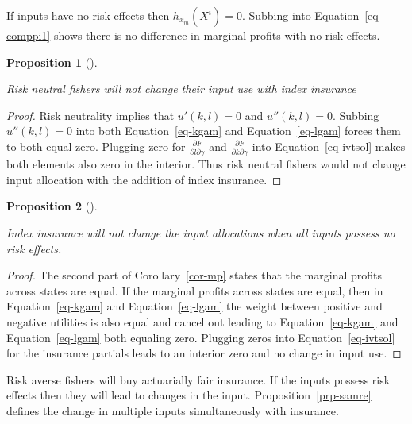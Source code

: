 \documentclass[
  letterpaper,
  DIV=11,
  numbers=noendperiod]{scrartcl}
\theoremstyle{plain}
\newtheorem{proposition}{Proposition}[section]
\theoremstyle{plain}
\theoremstyle{remark}
\begin{document}
If inputs have no risk effects then \(h_{x_m}(X^i)=0\). Subbing into
Equation~\ref{eq-comppi1} shows there is no difference in marginal
profits with no risk effects.

\begin{proposition}[]\protect\hypertarget{prp-rn}{}\label{prp-rn}

Risk neutral fishers will not change their input use with index
insurance

\end{proposition}

\begin{proof}

Risk neutrality implies that \(u'(k,l)=0\) and \(u''(k,l)=0\). Subbing
\(u''(k,l)=0\) into both Equation~\ref{eq-kgam} and
Equation~\ref{eq-lgam} forces them to both equal zero. Plugging zero for
\(\frac{\partial F}{\partial l \partial \gamma}\) and
\(\frac{\partial F}{\partial k \partial \gamma}\) into
Equation~\ref{eq-ivtsol} makes both elements also zero in the interior.
Thus risk neutral fishers would not change input allocation with the
addition of index insurance.

\end{proof}

\begin{proposition}[]\protect\hypertarget{prp-rezero}{}\label{prp-rezero}

Index insurance will not change the input allocations when all inputs
possess no risk effects.

\end{proposition}

\begin{proof}

The second part of Corollary~\ref{cor-mp} states that the marginal
profits across states are equal. If the marginal profits across states
are equal, then in Equation~\ref{eq-kgam} and Equation~\ref{eq-lgam} the
weight between positive and negative utilities is also equal and cancel
out leading to Equation~\ref{eq-kgam} and Equation~\ref{eq-lgam} both
equaling zero. Plugging zeros into Equation~\ref{eq-ivtsol} for the
insurance partials leads to an interior zero and no change in input use.

\end{proof}

Risk averse fishers will buy actuarially fair insurance. If the inputs
possess risk effects then they will lead to changes in the input.
Proposition~\ref{prp-samre} defines the change in multiple inputs
simultaneously with insurance.
\end{document}
